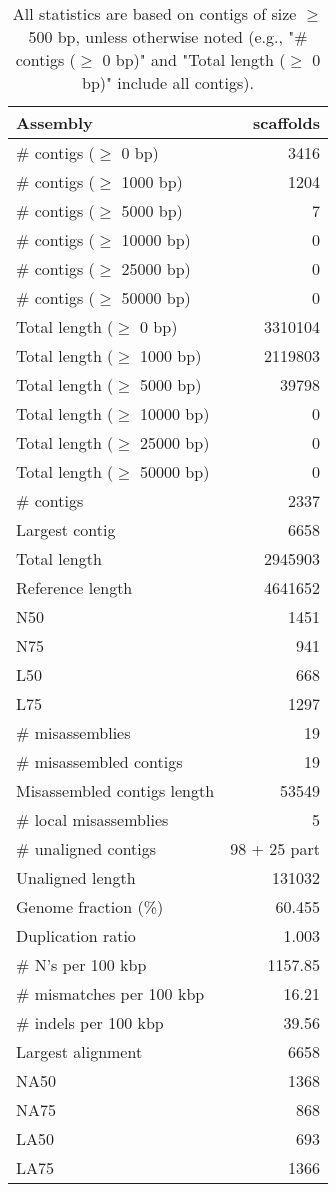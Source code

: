 \documentclass[12pt,a4paper]{article}
\begin{document}
\begin{table}[ht]
\begin{center}
\caption{All statistics are based on contigs of size $\geq$ 500 bp, unless otherwise noted (e.g., "\# contigs ($\geq$ 0 bp)" and "Total length ($\geq$ 0 bp)" include all contigs).}
\begin{tabular}{|l*{1}{|r}|}
\hline
Assembly & scaffolds \\ \hline
\# contigs ($\geq$ 0 bp) & 3416 \\ \hline
\# contigs ($\geq$ 1000 bp) & 1204 \\ \hline
\# contigs ($\geq$ 5000 bp) & 7 \\ \hline
\# contigs ($\geq$ 10000 bp) & 0 \\ \hline
\# contigs ($\geq$ 25000 bp) & 0 \\ \hline
\# contigs ($\geq$ 50000 bp) & 0 \\ \hline
Total length ($\geq$ 0 bp) & 3310104 \\ \hline
Total length ($\geq$ 1000 bp) & 2119803 \\ \hline
Total length ($\geq$ 5000 bp) & 39798 \\ \hline
Total length ($\geq$ 10000 bp) & 0 \\ \hline
Total length ($\geq$ 25000 bp) & 0 \\ \hline
Total length ($\geq$ 50000 bp) & 0 \\ \hline
\# contigs & 2337 \\ \hline
Largest contig & 6658 \\ \hline
Total length & 2945903 \\ \hline
Reference length & 4641652 \\ \hline
N50 & 1451 \\ \hline
N75 & 941 \\ \hline
L50 & 668 \\ \hline
L75 & 1297 \\ \hline
\# misassemblies & 19 \\ \hline
\# misassembled contigs & 19 \\ \hline
Misassembled contigs length & 53549 \\ \hline
\# local misassemblies & 5 \\ \hline
\# unaligned contigs & 98 + 25 part \\ \hline
Unaligned length & 131032 \\ \hline
Genome fraction (\%) & 60.455 \\ \hline
Duplication ratio & 1.003 \\ \hline
\# N's per 100 kbp & 1157.85 \\ \hline
\# mismatches per 100 kbp & 16.21 \\ \hline
\# indels per 100 kbp & 39.56 \\ \hline
Largest alignment & 6658 \\ \hline
NA50 & 1368 \\ \hline
NA75 & 868 \\ \hline
LA50 & 693 \\ \hline
LA75 & 1366 \\ \hline
\end{tabular}
\end{center}
\end{table}
\end{document}
